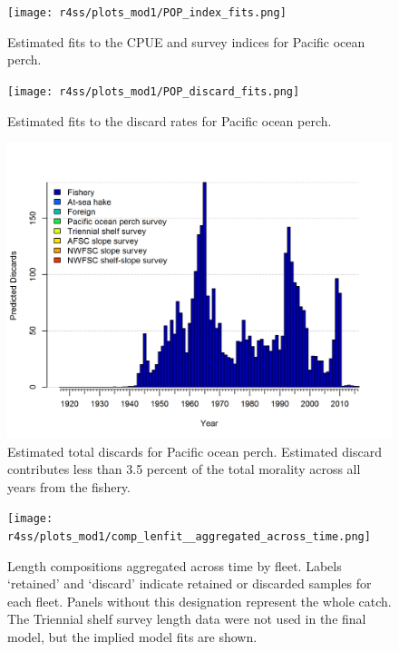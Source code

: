 \documentclass[12pt,]{article}
\begin{document}
\FloatBarrier

\begin{figure}
\centering
\texttt{[image: r4ss/plots\_mod1/POP\_index\_fits.png]}
\caption{Estimated fits to the CPUE and survey indices for Pacific ocean
perch. \label{fig:index_fits}}
\end{figure}

\FloatBarrier 

\begin{figure}
\centering
\texttt{[image: r4ss/plots\_mod1/POP\_discard\_fits.png]}
\caption{Estimated fits to the discard rates for Pacific ocean perch.
\label{fig:discard_fits}}
\end{figure}

\FloatBarrier 

\begin{figure}
\centering
\includegraphics{r4ss/plots_mod1/catch7 discards stacked plot (depends on multiple fleets).png}
\caption{Estimated total discards for Pacific ocean perch. Estimated
discard contributes less than 3.5 percent of the total morality across
all years from the fishery. \label{fig:total_discard}}
\end{figure}

\begin{figure}
\centering
\texttt{[image: r4ss/plots\_mod1/comp\_lenfit\_\_aggregated\_across\_time.png]}
\caption{Length compositions aggregated across time by fleet. Labels
`retained' and `discard' indicate retained or discarded samples for each
fleet. Panels without this designation represent the whole catch. The
Triennial shelf survey length data were not used in the final model, but
the implied model fits are shown. \label{fig:length_agg}}
\end{figure}
\end{document}
